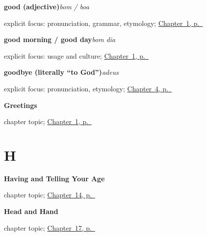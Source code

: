 \noindent\begin{minipage}[t]{\linewidth}
\raggedright
\textbf{good (adjective)}\enspace\emph{bom / boa}\par
\footnotesize explicit focus: pronunciation, grammar, etymology; \hyperref[ch:greetings]{Chapter~1, p.~\pageref*{ch:greetings}}
\end{minipage}\par\smallskip

\noindent\begin{minipage}[t]{\linewidth}
\raggedright
\textbf{good morning / good day}\enspace\emph{bom dia}\par
\footnotesize explicit focus: usage and culture; \hyperref[ch:greetings]{Chapter~1, p.~\pageref*{ch:greetings}}
\end{minipage}\par\smallskip

\noindent\begin{minipage}[t]{\linewidth}
\raggedright
\textbf{goodbye (literally \textquotedblleft{}to God\textquotedblright{})}\enspace\emph{adeus}\par
\footnotesize explicit focus: pronunciation, etymology; \hyperref[ch:pt-farewells]{Chapter~4, p.~\pageref*{ch:pt-farewells}}
\end{minipage}\par\smallskip

\noindent\begin{minipage}[t]{\linewidth}
\raggedright
\textbf{Greetings}\par
\footnotesize chapter topic; \hyperref[ch:greetings]{Chapter~1, p.~\pageref*{ch:greetings}}
\end{minipage}\par\smallskip

\section*{H}

\noindent\begin{minipage}[t]{\linewidth}
\raggedright
\textbf{Having and Telling Your Age}\par
\footnotesize chapter topic; \hyperref[ch:pt-having-and-age]{Chapter~14, p.~\pageref*{ch:pt-having-and-age}}
\end{minipage}\par\smallskip

\noindent\begin{minipage}[t]{\linewidth}
\raggedright
\textbf{Head and Hand}\par
\footnotesize chapter topic; \hyperref[ch:pt-head-and-hand]{Chapter~17, p.~\pageref*{ch:pt-head-and-hand}}
\end{minipage}\par\smallskip

